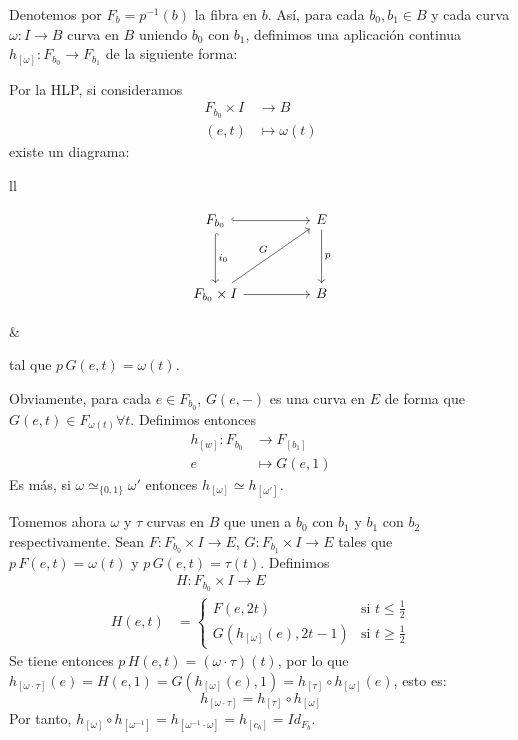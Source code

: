 \begin{demo}
Denotemos por $F_b = p^{-1}(b)$ la fibra en $b$. Así, para cada $b_0, b_1 \in B$ y cada curva $\omega : I \longrightarrow B$ curva en $B$ uniendo $b_0$ con $b_1$, definimos una aplicación continua $h_[\omega] : F_{b_0} \longrightarrow F_{b_1}$ de la siguiente forma: \par 
Por la HLP, si consideramos 
\begin{align*}
F_{b_0} \times I &\longrightarrow B \\
(e, t) &\longmapsto \omega(t)
\end{align*}
existe un diagrama: \par
\begin{tabular}{ll}
\begin{minipage}{0.5\textwidth}
\[
\begin{tikzcd}
F_{b_0} \arrow[hook]{rr} \arrow[hook]{dd}{i_0} & & E \arrow{dd}{p} \\
\\
F_{b_0} \times I \arrow{rr} \arrow{uurr}{G} & & B
\end{tikzcd}
\]
\end{minipage}
&
\begin{minipage}{0.5\textwidth}
tal que $p \, G(e,t) = \omega(t)$. 
\end{minipage}
\end{tabular}
Obviamente, para cada $e \in F_{b_0}$, $G(e,-)$ es una curva en $E$ de forma que $G(e,t) \in F_{\omega(t)} \forall t$. Definimos entonces
\begin{align*}
h_{[w]} : F_{b_0} &\longrightarrow F_{[b_1]} \\
e &\longmapsto G(e,1)
\end{align*}
Es más, si $\omega \simeq_{\{0,1\}} \omega'$ entonces $h_{[\omega]} \simeq h_{[\omega']}$. \par
Tomemos ahora $\omega$ y $\tau$ curvas en $B$ que unen a $b_0$ con $b_1$ y $b_1$ con $b_2$ respectivamente. Sean $F : F_{b_0} \times I \longrightarrow E$, $G: F_{b_1} \times I \longrightarrow E$ tales que $p \, F(e,t) = \omega(t)$ y $p \, G(e,t) = \tau(t)$. Definimos
\begin{align*}
& H : F_{b_0} \times I \longrightarrow E \\
H(e,t) &= \begin{cases}
F(e, 2t) & \text{si } t \leq \frac{1}{2} \\
G(h_{[\omega]}(e), 2t -1) & \text{si } t \geq \frac{1}{2}
\end{cases}
\end{align*}
Se tiene entonces $p \, H(e,t) = (\omega \cdotp \tau)(t)$, por lo que $h_{[\omega \cdotp \tau]} (e) = H(e,1) = G(h_{[\omega]}(e), 1) = 
h_{[\tau]} \circ h_{[\omega]}(e)$, esto es:
\[ h_{[\omega \cdotp \tau]} = h_{[\tau]} \circ h_{[\omega]} \]
Por tanto, $h_{[\omega]} \circ h_{[\omega^{-1}]} = h_{[\omega^{-1} \cdotp \omega]} = h_{[c_b]} = Id_{F_b}$.


\end{demo}
